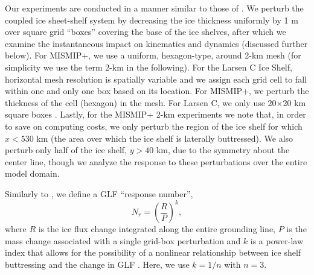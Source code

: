 \documentclass[review,oneside]{igs}
\begin{document}
Our experiments are conducted in a manner similar to those of \citet{reese2018}. We perturb the coupled ice sheet-shelf system by decreasing the ice thickness uniformly by 1 m over square grid ``boxes'' covering the base of the ice shelves, after which we examine the instantaneous impact on kinematics and dynamics (discussed further below). For MISMIP+, we use a uniform, hexagon-type, around 2-km mesh (for simplicity we use the term 2-km in the following). For the Larsen C Ice Shelf, horizontal mesh resolution is spatially variable and we assign each grid cell to fall within one and only one box based on its location. For MISMIP+, we perturb the thickness of the cell (hexagon) in the mesh. For Larsen C, we only use 20$\times$20 km square boxes \citep[the same resolution as in][]{reese2018}. Lastly, for the MISMIP+ 2-km experiments we note that, in order to save on computing costs, we only perturb the region of the ice shelf for which $x<530$ km (the area over which the ice shelf is laterally buttressed).  We also perturb only half of the ice shelf, $y>40$ km, due to the symmetry about the center line, though we analyze the response to these perturbations over the entire model domain. 

Similarly to \citet{reese2018}, we define a GLF ``response number'',
\begin{equation}
N_r = \left(\frac{R}{P}\right)^k,
\end{equation}
where $R$ is the ice flux change integrated along the entire grounding line, $P$ is the mass change associated with a single grid-box perturbation and $k$ is a power-law index that allows for the possibility of a nonlinear relationship between ice shelf buttressing and the change in GLF \citep[see also][]{schoof2007}. Here, we use $k=1/n$ with $n=3$.
\end{document}
